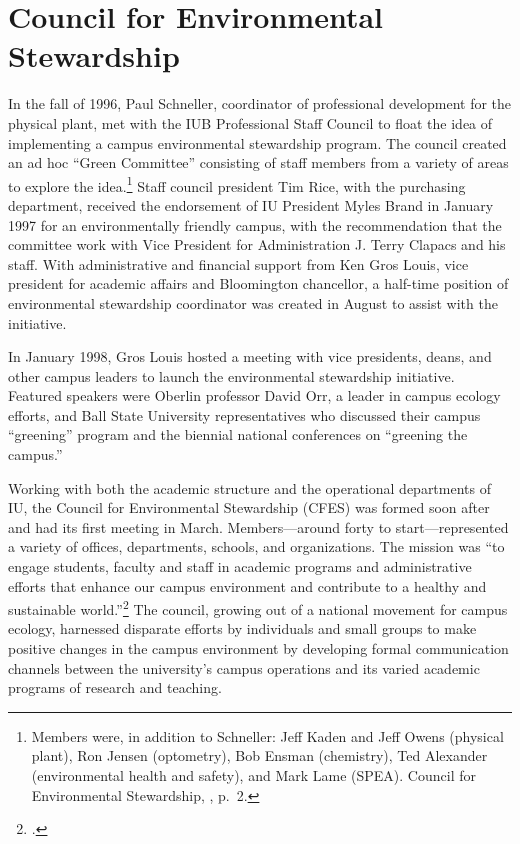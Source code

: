 \documentclass[
  american,
  letterpaper,
]{scrreprt}
\begin{document}
\section{Council for Environmental
Stewardship}\label{council-for-environmental-stewardship}

In the fall of 1996, Paul Schneller, coordinator of professional
development for the physical plant, met with the IUB Professional Staff
Council to float the idea of implementing a campus environmental
stewardship program. The council created an ad hoc ``Green Committee''
consisting of staff members from a variety of areas to explore the
idea.\footnote{Members were, in addition to Schneller: Jeff Kaden and
  Jeff Owens (physical plant), Ron Jensen (optometry), Bob Ensman
  (chemistry), Ted Alexander (environmental health and safety), and Mark
  Lame (SPEA). Council for Environmental Stewardship,
  , p.~2.} Staff
council president Tim Rice, with the purchasing department, received the
endorsement of IU President Myles Brand in January 1997 for an
environmentally friendly campus, with the recommendation that the
committee work with Vice President for Administration J. Terry Clapacs
and his staff. With administrative and financial support from Ken Gros
Louis, vice president for academic affairs and Bloomington chancellor, a
half-time position of environmental stewardship coordinator was created
in August to assist with the initiative.

In January 1998, Gros Louis hosted a meeting with vice presidents,
deans, and other campus leaders to launch the environmental stewardship
initiative. Featured speakers were Oberlin professor David Orr, a leader
in campus ecology efforts, and Ball State University representatives who
discussed their campus ``greening'' program and the biennial national
conferences on ``greening the campus.''

Working with both the academic structure and the operational departments
of IU, the Council for Environmental Stewardship (CFES) was formed soon
after and had its first meeting in March. Members---around forty to
start---represented a variety of offices, departments, schools, and
organizations. The mission was ``to engage students, faculty and staff
in academic programs and administrative efforts that enhance our campus
environment and contribute to a healthy and sustainable
world.''\footnote{.} The council, growing out of a national movement for
campus ecology, harnessed disparate efforts by individuals and small
groups to make positive changes in the campus environment by developing
formal communication channels between the university's campus operations
and its varied academic programs of research and teaching.
\end{document}

